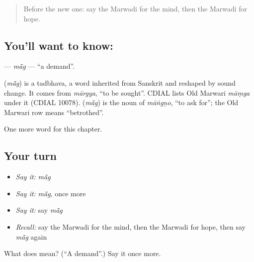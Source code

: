 \label{lesson:MW-C111-mag}



\begin{quote}
Before the new one: say the Marwadi for the mind, then the Marwadi for hope.
\end{quote}

\subsection*{You'll want to know: }
\textbf{} — \emph{mā̃g} — \textquotedblleft{}a demand\textquotedblright{}.

\begin{cousinweb}
\textbf{} (\emph{mā̃g}) is a tadbhava, a word inherited from Sanskrit and reshaped by sound change. It comes from \emph{mārgya}, \textquotedblleft{}to be sought\textquotedblright{}. CDIAL lists Old Marwari \emph{māṃga} under it (CDIAL 10078). \textbf{} (\emph{mā̃g}) is the noun of \emph{māṅgṇo}, \textquotedblleft{}to ask for\textquotedblright{}; the Old Marwari row means \textquotedblleft{}betrothed\textquotedblright{}.
\end{cousinweb}

\begin{grammarlens}[title={What you've built}]
One more word for this chapter.
\end{grammarlens}

\subsection*{Your turn}
\begin{itemize}
\raggedright
  \item \emph{Say it:} \emph{mā̃g}
  \item \emph{Say it:} \emph{mā̃g}, once more
  \item \emph{Say it:} say \emph{mā̃g}
  \item \emph{Recall:} say the Marwadi for the mind, then the Marwadi for hope, then say \emph{mā̃g} again
\end{itemize}

\begin{tcolorbox}[breakable,colback=teal!4,colframe=teal!35!black,title={Before you move on}]
What does  mean? (\textquotedblleft{}A demand\textquotedblright{}.) Say it once more.
\end{tcolorbox}
